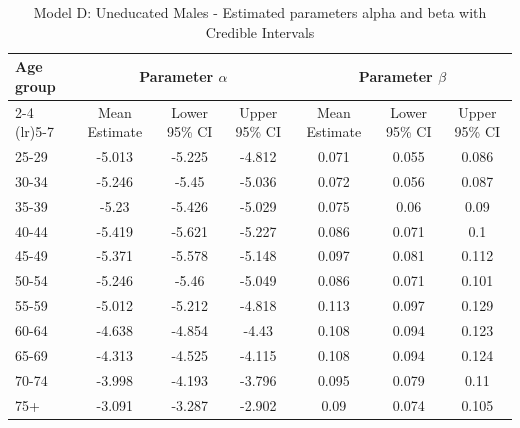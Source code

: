 \begin{landscape}
\begin{table}[htbp]
\centering
\caption{Model D: Uneducated Males - Estimated parameters alpha and beta  with Credible Intervals}
\label{tab:parameters_ab29}
\begin{tabular}{@{}lcccccc@{}}
\toprule
Age group & \multicolumn{3}{c}{Parameter \(\alpha\)} & \multicolumn{3}{c}{Parameter \(\beta\)} \\ 
\cmidrule(lr){2-4} \cmidrule(lr){5-7}
          & Mean Estimate & Lower 95\% CI & Upper 95\% CI & Mean Estimate & Lower 95\% CI & Upper 95\% CI \\ 
\midrule
25-29 & -5.013 & -5.225 & -4.812 & 0.071 & 0.055 & 0.086 \\
30-34 & -5.246 & -5.45 & -5.036 & 0.072 & 0.056 & 0.087 \\
35-39 & -5.23 & -5.426 & -5.029 & 0.075 & 0.06 & 0.09 \\
40-44 & -5.419 & -5.621 & -5.227 & 0.086 & 0.071 & 0.1 \\
45-49 & -5.371 & -5.578 & -5.148 & 0.097 & 0.081 & 0.112 \\
50-54 & -5.246 & -5.46 & -5.049 & 0.086 & 0.071 & 0.101 \\
55-59 & -5.012 & -5.212 & -4.818 & 0.113 & 0.097 & 0.129 \\
60-64 & -4.638 & -4.854 & -4.43 & 0.108 & 0.094 & 0.123 \\
65-69 & -4.313 & -4.525 & -4.115 & 0.108 & 0.094 & 0.124 \\
70-74 & -3.998 & -4.193 & -3.796 & 0.095 & 0.079 & 0.11 \\
75+ & -3.091 & -3.287 & -2.902 & 0.09 & 0.074 & 0.105 \\
\bottomrule
\end{tabular}
\end{table}
\end{landscape}